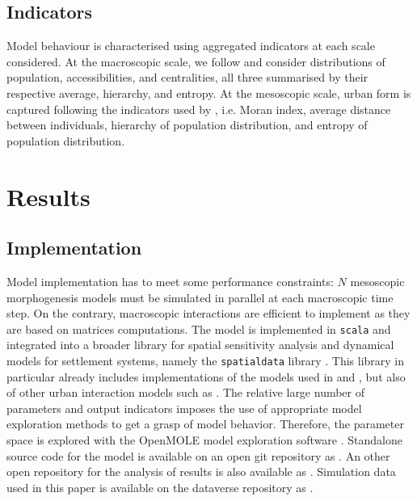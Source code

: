 \documentclass[referee,lineno,pdflatex,sn-apa]{sn-jnl}
\begin{document}






\subsection{Indicators}

Model behaviour is characterised using aggregated indicators at each scale considered. At the  macroscopic scale, we follow \cite{raimbault2020unveiling} and consider distributions of population, accessibilities, and centralities, all three summarised by their respective average, hierarchy, and entropy. At the mesoscopic scale, urban form is captured following the indicators used by \cite{raimbault2018calibration}, i.e. Moran index, average distance between individuals, hierarchy of population distribution, and entropy of population distribution.


\section{Results}


\subsection{Implementation}

Model implementation has to meet some performance constraints: $N$ mesoscopic morphogenesis models must be simulated in parallel at each macroscopic time step. On the contrary, macroscopic interactions are efficient to implement as they are based on matrices computations. The model is implemented in \texttt{scala} and integrated into a broader library for spatial sensitivity analysis and dynamical models for settlement systems, namely the \texttt{spatialdata} library \cite{raimbault2020scala}. This library in particular already includes implementations of the models used in \cite{raimbault2020indirect} and \cite{raimbault2018calibration}, but also of other urban interaction models such as \cite{favaro2011gibrat}. The relative large number of parameters and output indicators imposes the use of appropriate model exploration methods to get a grasp of model behavior. Therefore, the parameter space is explored with the OpenMOLE model exploration software \citep{reuillon2013openmole}. Standalone source code for the model is available on an open git repository as \cite{urbangrowthmodel}. An other open repository for the analysis of results is also available as \cite{urbangrowth}. Simulation data used in this paper is available on the dataverse repository as \cite{dataverse}.
\end{document}
